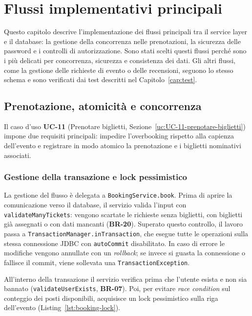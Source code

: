 \chapter{Flussi implementativi principali}
\label{cap:implementazione}
Questo capitolo descrive l'implementazione dei flussi principali tra il service layer e il database: la gestione della concorrenza nelle prenotazioni, la sicurezza delle password e i controlli di autorizzazione.
Sono stati scelti questi flussi perché sono i più delicati per concorrenza, sicurezza e consistenza dei dati. Gli altri flussi, come la gestione delle richieste di evento o delle recensioni, seguono lo stesso schema e sono verificati dai test descritti nel Capitolo~\ref{cap:test}.

\section{Prenotazione, atomicità e concorrenza}
\label{sec:prenotazione-concorrenza}
Il caso d'uso \textbf{UC-11} (Prenotare biglietti, Sezione~\ref{uc:UC-11-prenotare-biglietti}) impone due requisiti principali: impedire l'overbooking rispetto alla capienza dell'evento e registrare in modo atomico la prenotazione e i biglietti nominativi associati.

\subsection{Gestione della transazione e lock pessimistico}
\label{sec:gestione-transazione-lock}

La gestione del flusso è delegata a \texttt{BookingService.book}. Prima di aprire la comunicazione verso il database, il servizio valida l'input con \texttt{validateManyTickets}: vengono scartate le richieste senza biglietti, con biglietti già assegnati o con dati mancanti (\textbf{BR-20}).
Superato questo controllo, il lavoro passa a \texttt{TransactionManager.inTransaction}, che esegue tutte le operazioni sulla stessa connessione JDBC con \texttt{autoCommit} disabilitato. In caso di errore le modifiche vengono annullate con un \textit{rollback}; se invece si guasta la connessione o fallisce il commit, viene sollevata una \texttt{TransactionException}.

All'interno della transazione il servizio verifica prima che l'utente esista e non sia bannato (\texttt{validateUserExists}, \textbf{BR-07}). Poi, per evitare \textit{race condition} sul conteggio dei posti disponibili, acquisisce un lock pessimistico sulla riga dell'evento (Listing~\ref{lst:booking-lock}).


